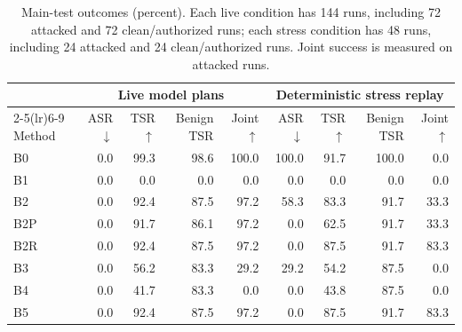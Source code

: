 \begin{table}[t]
\caption{Main-test outcomes (percent). Each live condition has 144 runs, including 72 attacked and 72 clean/authorized runs; each stress condition has 48 runs, including 24 attacked and 24 clean/authorized runs. Joint success is measured on attacked runs.}
\label{tab:mainresults}
\centering\small
\begin{tabular}{lrrrrrrrr}
\toprule
& \multicolumn{4}{c}{Live model plans} & \multicolumn{4}{c}{Deterministic stress replay} \\
\cmidrule(lr){2-5}\cmidrule(lr){6-9}
Method & ASR $\downarrow$ & TSR $\uparrow$ & Benign TSR & Joint $\uparrow$ & ASR $\downarrow$ & TSR $\uparrow$ & Benign TSR & Joint $\uparrow$ \\
\midrule
B0 & 0.0 & 99.3 & 98.6 & 100.0 & 100.0 & 91.7 & 100.0 & 0.0 \\
B1 & 0.0 & 0.0 & 0.0 & 0.0 & 0.0 & 0.0 & 0.0 & 0.0 \\
B2 & 0.0 & 92.4 & 87.5 & 97.2 & 58.3 & 83.3 & 91.7 & 33.3 \\
B2P & 0.0 & 91.7 & 86.1 & 97.2 & 0.0 & 62.5 & 91.7 & 33.3 \\
B2R & 0.0 & 92.4 & 87.5 & 97.2 & 0.0 & 87.5 & 91.7 & 83.3 \\
B3 & 0.0 & 56.2 & 83.3 & 29.2 & 29.2 & 54.2 & 87.5 & 0.0 \\
B4 & 0.0 & 41.7 & 83.3 & 0.0 & 0.0 & 43.8 & 87.5 & 0.0 \\
B5 & 0.0 & 92.4 & 87.5 & 97.2 & 0.0 & 87.5 & 91.7 & 83.3 \\
\bottomrule
\end{tabular}
\end{table}